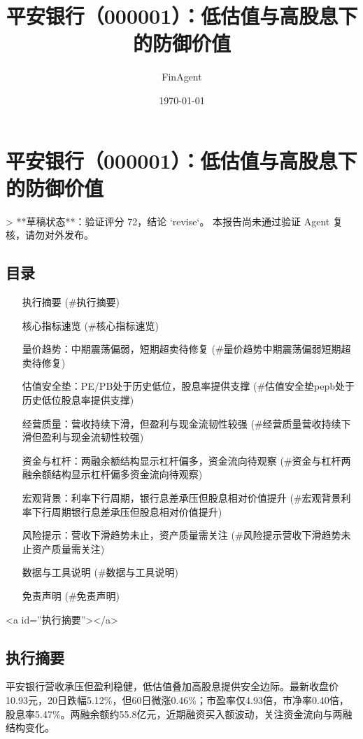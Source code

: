 \documentclass[12pt,a4paper]{article}
\title{平安银行（000001）：低估值与高股息下的防御价值}
\author{FinAgent}
\date{\today}
\begin{document}
\maketitle
\tableofcontents
\newpage
\sloppy
\section{平安银行（000001）：低估值与高股息下的防御价值}

> **草稿状态**：验证评分 72，结论 `revise`。 本报告尚未通过验证 Agent 复核，请勿对外发布。

\subsection{ 目录}

\begin{itemize}
\item [执行摘要](\#执行摘要)
\item [核心指标速览](\#核心指标速览)
\item [量价趋势：中期震荡偏弱，短期超卖待修复](\#量价趋势中期震荡偏弱短期超卖待修复)
\item [估值安全垫：PE/PB处于历史低位，股息率提供支撑](\#估值安全垫pepb处于历史低位股息率提供支撑)
\item [经营质量：营收持续下滑，但盈利与现金流韧性较强](\#经营质量营收持续下滑但盈利与现金流韧性较强)
\item [资金与杠杆：两融余额结构显示杠杆偏多，资金流向待观察](\#资金与杠杆两融余额结构显示杠杆偏多资金流向待观察)
\item [宏观背景：利率下行周期，银行息差承压但股息相对价值提升](\#宏观背景利率下行周期银行息差承压但股息相对价值提升)
\item [风险提示：营收下滑趋势未止，资产质量需关注](\#风险提示营收下滑趋势未止资产质量需关注)
\item [数据与工具说明](\#数据与工具说明)
\item [免责声明](\#免责声明)
\end{itemize}

<a id=''执行摘要''></a>

\subsection{ 执行摘要}
平安银行营收承压但盈利稳健，低估值叠加高股息提供安全边际。最新收盘价10.93元，20日跌幅5.12\%，但60日微涨0.46\%；市盈率仅4.93倍，市净率0.40倍，股息率5.47\%。两融余额约55.8亿元，近期融资买入额波动，关注资金流向与两融结构变化。
\end{document}

